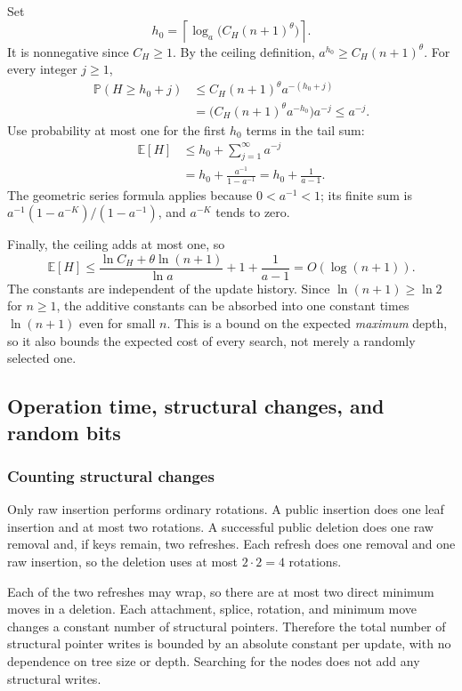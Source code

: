 \documentclass[11pt,a4paper]{article}
\theoremstyle{readable}
\newcommand{\E}{\mathbb E}
\newcommand{\Prob}{\mathbb P}
\newcommand{\ceil}[1]{\left\lceil #1\right\rceil}
\begin{document}
Set
\[
  h_0=\ceil{\log_a\bigl(C_H(n+1)^\theta\bigr)}.
\]
It is nonnegative since $C_H\ge1$. By the ceiling definition,
$a^{h_0}\ge C_H(n+1)^\theta$. For every integer $j\ge1$,
\begin{align*}
  \Prob(H\ge h_0+j)
    &\le C_H(n+1)^\theta a^{-(h_0+j)}\\
    &=\bigl(C_H(n+1)^\theta a^{-h_0}\bigr)a^{-j}
      \le a^{-j}.
\end{align*}
Use probability at most one for the first $h_0$ terms in the tail sum:
\begin{align*}
  \E[H]
    &\le h_0+\sum_{j=1}^\infty a^{-j}\\
    &=h_0+\frac{a^{-1}}{1-a^{-1}}
      =h_0+\frac1{a-1}.
\end{align*}
The geometric series formula applies because $0<a^{-1}<1$; its finite
sum is $a^{-1}(1-a^{-K})/(1-a^{-1})$, and $a^{-K}$ tends to zero.

Finally, the ceiling adds at most one, so
\begin{equation}
  \E[H]\le
    \frac{\ln C_H+\theta\ln(n+1)}{\ln a}
      +1+\frac1{a-1}=O(\log(n+1)).
  \label{eq:expected-height}
\end{equation}
The constants are independent of the update history. Since
$\ln(n+1)\ge\ln2$ for $n\ge1$, the additive constants can be
absorbed into one constant times $\ln(n+1)$ even for small $n$.
This is a bound on the expected \emph{maximum} depth, so it also bounds
the expected cost of every search, not merely a randomly selected one.

\subsection{Operation time, structural changes, and random bits}
\label{sec:costs}

\subsubsection*{Counting structural changes}
Only raw insertion performs ordinary rotations. A public insertion
does one leaf insertion and at most two rotations. A successful public
deletion does one raw removal and, if keys remain, two refreshes. Each
refresh does one removal and one raw insertion, so the deletion uses
at most $2\cdot2=4$ rotations.

Each of the two refreshes may wrap, so there are at most two direct
minimum moves in a deletion. Each attachment, splice, rotation, and
minimum move changes a constant number of structural pointers.
Therefore the total number of structural pointer writes is bounded
by an absolute constant per update, with no dependence on tree size
or depth. Searching for the nodes does not add any structural writes.
\end{document}
